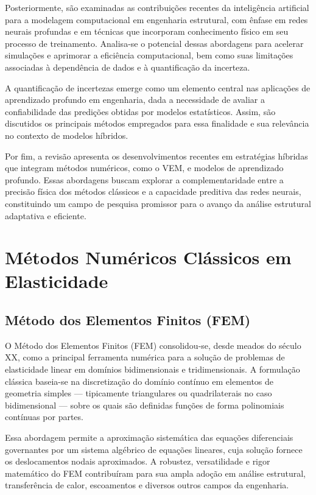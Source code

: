\documentclass[12pt,openright,oneside,a4paper,english,brazil]{abntex2}
\begin{document}
Posteriormente, são examinadas as contribuições recentes da inteligência artificial para a modelagem computacional em engenharia estrutural, com ênfase em redes neurais profundas e em técnicas que incorporam conhecimento físico em seu processo de treinamento. Analisa-se o potencial dessas abordagens para acelerar simulações e aprimorar a eficiência computacional, bem como suas limitações 
associadas à dependência de dados e à quantificação da incerteza.

A quantificação de incertezas emerge como um elemento central nas aplicações de aprendizado profundo em engenharia, dada a necessidade de avaliar a confiabilidade das predições obtidas por modelos estatísticos. Assim, são discutidos os principais métodos empregados para essa finalidade e sua relevância no contexto de modelos híbridos.

Por fim, a revisão apresenta os desenvolvimentos recentes em estratégias híbridas que integram métodos numéricos, como o VEM, e modelos de aprendizado profundo. Essas abordagens buscam explorar a complementaridade entre a precisão física dos métodos clássicos e a capacidade preditiva das redes neurais, constituindo um campo de pesquisa promissor para o avanço da análise estrutural adaptativa 
e eficiente.

\section{Métodos Numéricos Clássicos em Elasticidade}

\subsection{Método dos Elementos Finitos (FEM)}

O Método dos Elementos Finitos (FEM) consolidou-se, desde meados do século XX, como a principal ferramenta numérica para a solução de problemas de elasticidade linear em domínios bidimensionais e tridimensionais. A formulação clássica baseia-se na discretização do domínio contínuo em elementos de geometria simples — tipicamente triangulares ou quadrilaterais no caso bidimensional — sobre os 
quais são definidas funções de forma polinomiais contínuas por partes.

Essa abordagem permite a aproximação sistemática das equações diferenciais governantes por um sistema algébrico de equações lineares, cuja solução fornece os deslocamentos nodais aproximados. A robustez, versatilidade e rigor matemático do FEM contribuíram para sua ampla adoção em análise estrutural, transferência de calor, escoamentos e diversos outros campos da engenharia.
\end{document}
